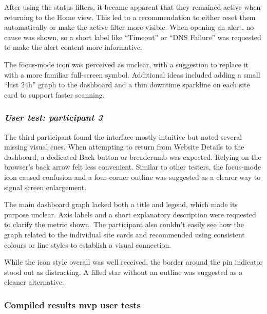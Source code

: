 After using the status filters, it became apparent that they remained active when returning to the Home view. This led to a recommendation to either reset them automatically or make the active filter more visible. When opening an alert, no cause was shown, so a short label like “Timeout” or “DNS Failure” was requested to make the alert content more informative.

The focus-mode icon was perceived as unclear, with a suggestion to replace it with a more familiar full-screen symbol. Additional ideas included adding a small “last 24h” graph to the dashboard and a thin downtime sparkline on each site card to support faster scanning.


\subsubsection{\textit{\textbf{User test: participant 3}}}

The third participant found the interface mostly intuitive but noted several missing visual cues. When attempting to return from Website Details to the dashboard, a dedicated Back button or breadcrumb was expected. Relying on the browser’s back arrow felt less convenient. Similar to other testers, the focus-mode icon caused confusion and a four-corner outline was suggested as a clearer way to signal screen enlargement.

The main dashboard graph lacked both a title and legend, which made its purpose unclear. Axis labels and a short explanatory description were requested to clarify the metric shown. The participant also couldn’t easily see how the graph related to the individual site cards and recommended using consistent colours or line styles to establish a visual connection.

While the icon style overall was well received, the border around the pin indicator stood out as distracting. A filled star without an outline was suggested as a cleaner alternative.


\subsubsection{Compiled results \acrshort{mvp} user tests}
\label{subsubsec:compiled_results_mvp}

